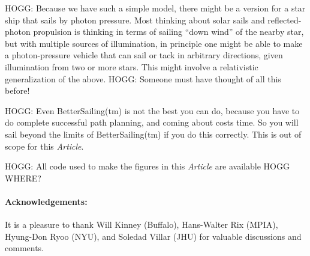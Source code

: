 \documentclass[letterpaper]{article}
\newcommand{\documentname}{\textsl{Article}}
\begin{document}
HOGG: Because we have such a simple model, there might be a version for a star ship that sails by photon pressure.
Most thinking about solar sails and reflected-photon propulsion is thinking in terms of sailing ``down wind'' of the nearby star, but with multiple sources of illumination, in principle one might be able to make a photon-pressure vehicle that can sail or tack in arbitrary directions, given illumination from two or more stars. This might involve a relativistic generalization of the above.
HOGG: Someone must have thought of all this before!

HOGG: Even BetterSailing(tm) is not the best you can do, because you have to do complete successful path planning, and coming about costs time. So you will sail beyond the limits of BetterSailing(tm) if you do this correctly. This is out of scope for this \documentname.

HOGG: All code used to make the figures in this \documentname{} are available HOGG WHERE?

\paragraph{Acknowledgements:}
It is a pleasure to thank Will Kinney (Buffalo), Hans-Walter Rix (MPIA), Hyung-Don Ryoo (NYU), and Soledad Villar (JHU) for valuable discussions and comments.



\end{document}

